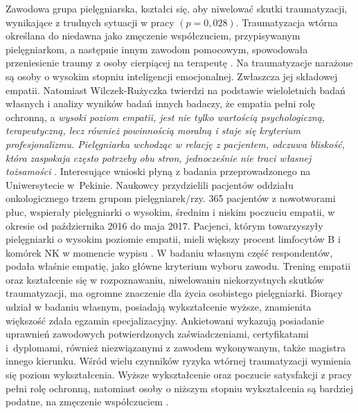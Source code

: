 \documentclass[a4paper,12pt,twoside,openright]{mwrep}
\begin{document}
Zawodowa grupa pielęgniarska, kształci się, aby niwelować skutki traumatyzacji, wynikające z trudnych sytuacji w pracy $(p=0,028)$. Traumatyzacja wtórna określana do niedawna jako zmęczenie współczuciem, przypisywanym pielęgniarkom, a następnie innym zawodom pomocowym, spowodowała przeniesienie traumy z osoby cierpiącej  na terapeutę \cite{figley}. Na traumatyzacje narażone są osoby o wysokim stopniu inteligencji emocjonalnej. Zwłaszcza jej składowej empatii. Natomiast Wilczek-Rużyczka twierdzi na podstawie wieloletnich badań własnych i analizy wyników badań innych badaczy, że empatia pełni rolę ochronną, a \textit{wysoki poziom empatii, jest nie tylko wartością psychologiczną, terapeutyczną, lecz również powinnością moralną i staje się kryterium profesjonalizmu.  Pielęgniarka wchodząc w relację z pacjentem, odczuwa bliskość, która zaspokaja często potrzeby obu stron, jednocześnie nie traci własnej tożsamości} \cite{wilczek}.  Interesujące wnioski płyną z badania przeprowadzonego na Uniwersytecie w~Pekinie. Naukowcy przydzielili pacjentów oddziału onkologicznego trzem grupom pielęgniarek/rzy. 365 pacjentów z nowotworami płuc, wspierały pielęgniarki o wysokim, średnim i niskim poczuciu empatii,  w okresie od października 2016 do maja 2017.  Pacjenci, którym towarzyszyły pielęgniarki o wysokim poziomie empatii, mieli większy procent limfocytów B i komórek NK w momencie wypisu \cite{nk}. W badaniu własnym część respondentów, podała właśnie empatię, jako główne kryterium wyboru zawodu. Trening empatii oraz kształcenie się w  rozpoznawaniu, niwelowaniu niekorzystnych skutków traumatyzacji,  ma ogromne znaczenie dla życia osobistego pielęgniarki. Biorący udział w badaniu własnym,  posiadają wykształcenie wyższe,  znamienita większość zdała egzamin specjalizacyjny. Ankietowani wykazują posiadanie uprawnień zawodowych potwierdzonych zaświadczeniami, certyfikatami i~dyplomami, również niezwiązanymi z zawodem wykonywanym, także magistra innego kierunku. Wśród wielu czynników ryzyka wtórnej traumatyzacji wymienia się poziom wykształcenia. Wyższe wykształcenie oraz poczucie satysfakcji z pracy pełni rolę ochronną, natomiast osoby o niższym stopniu wykształcenia są bardziej podatne, na zmęczenie współczuciem \cite{oginska}.
\end{document}
